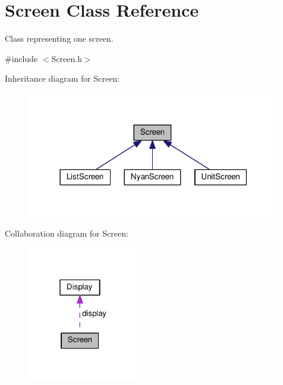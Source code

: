 \hypertarget{classScreen}{}\section{Screen Class Reference}
\label{classScreen}


Class representing one screen.  




{\ttfamily \#include $<$Screen.\+h$>$}



Inheritance diagram for Screen\+:\nopagebreak
\begin{figure}[H]
\begin{center}
\leavevmode
\includegraphics[width=315pt]{classScreen__inherit__graph}
\end{center}
\end{figure}


Collaboration diagram for Screen\+:\nopagebreak
\begin{figure}[H]
\begin{center}
\leavevmode
\includegraphics[width=139pt]{classScreen__coll__graph}
\end{center}
\end{figure}
